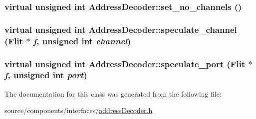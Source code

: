 \hypertarget{classAddressDecoder_e71176376557406822e5e17f7e7d5436}{
\subsubsection[{set\_\-no\_\-channels}]{\setlength{\rightskip}{0pt plus 5cm}virtual unsigned int AddressDecoder::set\_\-no\_\-channels ()}}
\label{classAddressDecoder_e71176376557406822e5e17f7e7d5436}


\hypertarget{classAddressDecoder_393586a5ded36349944cac2f9de11364}{
\subsubsection[{speculate\_\-channel}]{\setlength{\rightskip}{0pt plus 5cm}virtual unsigned int AddressDecoder::speculate\_\-channel ({\bf Flit} $\ast$ {\em f}, \/  unsigned int {\em channel})}}
\label{classAddressDecoder_393586a5ded36349944cac2f9de11364}


\hypertarget{classAddressDecoder_a8622bef1f397accdc7f2d255bed7f6b}{
\subsubsection[{speculate\_\-port}]{\setlength{\rightskip}{0pt plus 5cm}virtual unsigned int AddressDecoder::speculate\_\-port ({\bf Flit} $\ast$ {\em f}, \/  unsigned int {\em port})}}
\label{classAddressDecoder_a8622bef1f397accdc7f2d255bed7f6b}




The documentation for this class was generated from the following file:\begin{CompactItemize}
\item 
source/components/interfaces/\hyperlink{addressDecoder_8h}{addressDecoder.h}\end{CompactItemize}
